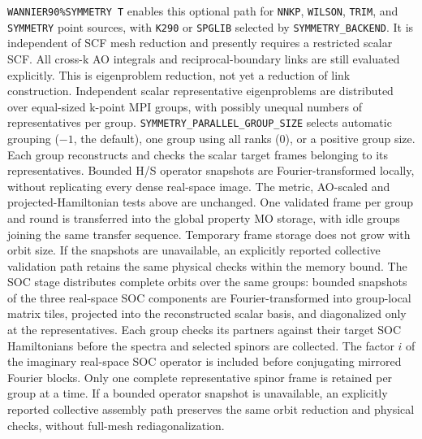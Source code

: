 \texttt{WANNIER90\%SYMMETRY T} enables this optional path for
\texttt{NNKP}, \texttt{WILSON}, \texttt{TRIM}, and
\texttt{SYMMETRY} point sources, with \texttt{K290} or
\texttt{SPGLIB} selected by \texttt{SYMMETRY\_BACKEND}.
It is independent of SCF mesh reduction and presently requires a
restricted scalar SCF. All cross-k AO integrals and reciprocal-boundary
links are still evaluated explicitly. This is eigenproblem reduction,
not yet a reduction of link construction. Independent scalar
representative eigenproblems are distributed over equal-sized k-point
MPI groups, with possibly unequal numbers of representatives per group.
\texttt{SYMMETRY\_PARALLEL\_GROUP\_SIZE} selects automatic grouping
($-1$, the default), one group using all ranks ($0$), or a positive
group size. Each group reconstructs and checks the scalar target frames
belonging to its representatives. Bounded H/S operator snapshots are
Fourier-transformed locally, without replicating every dense real-space
image. The metric, AO-scaled and projected-Hamiltonian tests above are
unchanged. One validated frame per group and round is transferred into
the global property MO storage, with idle groups joining the same
transfer sequence. Temporary frame storage does not grow with orbit size.
If the snapshots are unavailable, an explicitly reported collective
validation path retains the same physical checks within the memory bound.
The SOC stage distributes
complete orbits over the same groups: bounded snapshots of the three
real-space SOC components are Fourier-transformed into group-local
matrix tiles, projected into the reconstructed scalar basis, and
diagonalized only at the representatives. Each group checks its partners
against their target SOC Hamiltonians before the spectra and selected
spinors are collected. The factor $i$ of the imaginary real-space SOC
operator is included before conjugating mirrored Fourier blocks.
Only one complete representative spinor frame is retained per group
at a time. If a bounded operator snapshot is unavailable, an explicitly
reported collective assembly path preserves the same orbit reduction
and physical checks, without full-mesh rediagonalization.

